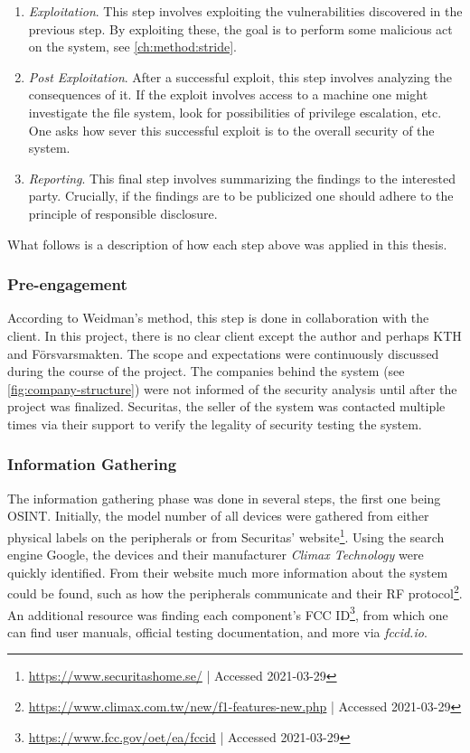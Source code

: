 \begin{enumerate}
    \item \textit{Exploitation}. This step involves exploiting the vulnerabilities discovered in the previous step. By exploiting these, the goal is to perform some malicious act on the system, see \ref{ch:method:stride}.
    \item \textit{Post Exploitation}. After a successful exploit, this step involves analyzing the consequences of it. If the exploit involves access to a machine one might investigate the file system, look for possibilities of privilege escalation, etc. One asks how sever this successful exploit is to the overall security of the system.
    \item \textit{Reporting}. This final step involves summarizing the findings to the interested party. Crucially, if the findings are to be publicized one should adhere to the principle of responsible disclosure.
\end{enumerate}
What follows is a description of how each step above was applied in this thesis.

\subsubsection{Pre-engagement}
According to Weidman's method, this step is done in collaboration with the client. In this project, there is no clear client except the author and perhaps KTH and Försvarsmakten. The scope and expectations were continuously discussed during the course of the project. The companies behind the system (see \ref{fig:company-structure}) were not informed of the security analysis until after the project was finalized. Securitas, the seller of the system was contacted multiple times via their support to verify the legality of security testing the system.

\subsubsection{Information Gathering}
The information gathering phase was done in several steps, the first one being \gls{OSINT}. Initially, the model number of all devices were gathered from either physical labels on the peripherals or from Securitas' website\footnote{\url{https://www.securitashome.se/} | Accessed 2021-03-29}. Using the search engine Google, the devices and their manufacturer \textit{Climax Technology} were quickly identified. From their website much more information about the system could be found, such as how the peripherals communicate and their \gls{RF} protocol\footnote{\url{https://www.climax.com.tw/new/f1-features-new.php} | Accessed 2021-03-29}. An additional resource was finding each component's FCC ID\footnote{\url{https://www.fcc.gov/oet/ea/fccid} | Accessed 2021-03-29}, from which one can find user manuals, official testing documentation, and more via \textit{fccid.io}.

